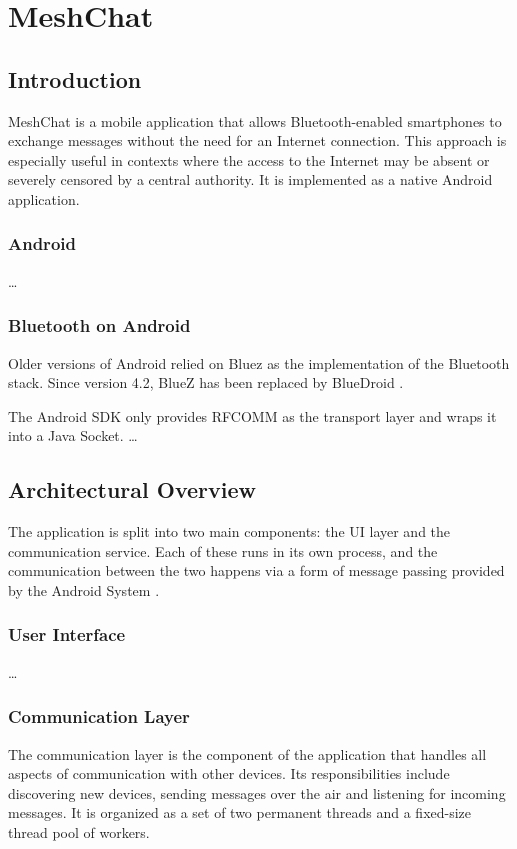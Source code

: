 \chapter{MeshChat}

\section{Introduction}
MeshChat is a mobile application that allows Bluetooth-enabled smartphones to exchange messages without the need for an Internet connection.
This approach is especially useful in contexts where the access to the Internet may be absent or severely censored by a central authority.
It is implemented as a native Android application.

\subsection{Android}
\dots

\subsection{Bluetooth on Android}
Older versions of Android relied on Bluez \cite{bluez} as the implementation of the Bluetooth stack.
Since version 4.2, BlueZ has been replaced by BlueDroid \cite{bluedroid}. 

The Android SDK only provides RFCOMM as the transport layer and wraps it into a Java Socket. \dots

\section{Architectural Overview}
The application is split into two main components: the UI layer and the communication service.
Each of these runs in its own process, and the communication between the two happens via a form of message passing provided by the Android System \cite{android_message}.

\subsection{User Interface}
\dots

\subsection{Communication Layer}
The communication layer is the component of the application that handles all aspects of communication with other devices.
Its responsibilities include discovering new devices, sending messages over the air and listening for incoming messages.
It is organized as a set of two permanent threads and a fixed-size thread pool of workers.

